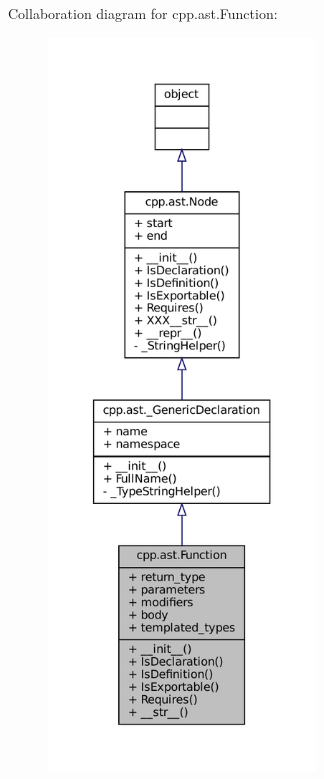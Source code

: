 Collaboration diagram for cpp.\+ast.\+Function\+:
\nopagebreak
\begin{figure}[H]
\begin{center}
\leavevmode
\includegraphics[height=550pt]{classcpp_1_1ast_1_1Function__coll__graph}
\end{center}
\end{figure}

